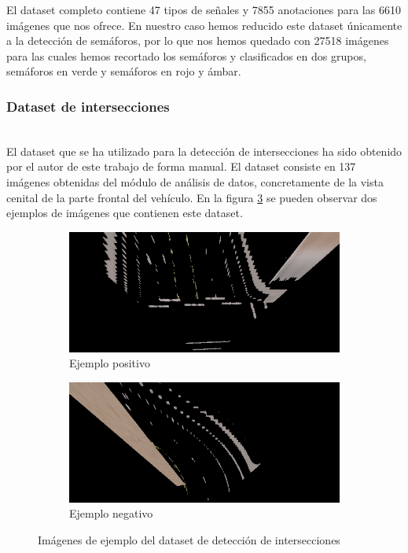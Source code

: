 El dataset completo contiene 47 tipos de señales y 7855 anotaciones para las 6610 imágenes que nos ofrece.
En nuestro caso hemos reducido este dataset únicamente a la detección de semáforos, por lo que nos hemos quedado con 27518 imágenes para las cuales hemos recortado los semáforos y clasificados en dos grupos, semáforos en verde y semáforos en rojo y ámbar.

\subsubsection{Dataset de intersecciones} \label{sec:datasetIntersecc}\mbox{}\\
El dataset que se ha utilizado para la detección de intersecciones ha sido obtenido por el autor de este trabajo de forma manual.
El dataset consiste en 137 imágenes obtenidas del módulo de análisis de datos, concretamente de la vista cenital de la parte frontal del vehículo.
En la figura \ref{fig:ejemplosintersecc} se pueden observar dos ejemplos de imágenes que contienen este dataset.

\begin{figure}[h!]
    \begin{subfigure}[c]{.5\textwidth}
      \centering
      \includegraphics[width=.9\linewidth]{img/ejemploIntersecSi.png}
      \caption{Ejemplo positivo}
      \label{fig:intersSI}
    \end{subfigure}%
    \begin{subfigure}[c]{.5\textwidth}
      \centering
      \includegraphics[width=.9\linewidth]{img/ejemploIntersecNO.png}
      \caption{Ejemplo negativo}
      \label{fig:intersNO}
    \end{subfigure}
    
    \caption{Imágenes de ejemplo del dataset de detección de intersecciones}
    \label{fig:ejemplosintersecc}
\end{figure}

